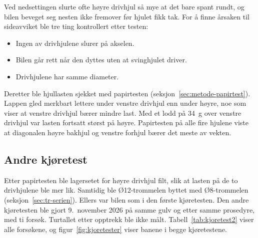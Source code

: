 Ved nedsettingen slurte ofte høyre drivhjul så mye at det bare spant rundt, og bilen beveget seg nesten ikke fremover før hjulet fikk tak. For å finne årsaken til sideavviket ble tre ting kontrollert etter testen:
\begin{itemize}
    \item Ingen av drivhjulene slurer på akselen.
    \item Bilen går rett når den dyttes uten at svinghjulet driver.
    \item Drivhjulene har samme diameter.
\end{itemize}

Deretter ble hjullasten sjekket med papirtesten (seksjon~\ref{sec:metode-papirtest}). Lappen gled merkbart lettere under venstre drivhjul enn under høyre, noe som viser at venstre drivhjul bærer mindre last. Med et lodd på \SI{34}{g} over venstre drivhjul var lasten fortsatt størst på høyre. Papirtesten på alle fire hjulene viste at diagonalen høyre bakhjul og venstre forhjul bærer det meste av vekten.

\subsection{Andre kjøretest}
\label{sec:res-kjoretest2}
Etter papirtesten ble lagersetet for høyre drivhjul filt, slik at lasten på de to drivhjulene ble mer lik. Samtidig ble Ø12-trommelen byttet med Ø8-trommelen (seksjon~\ref{sec:tr-serien}). Ellers var bilen som i den første kjøretesten. Den andre kjøretesten ble gjort 9.~november 2026 på samme gulv og etter samme prosedyre, med ti forsøk. Turtallet etter opptrekk ble ikke målt. Tabell~\ref{tab:kjoretest2} viser alle forsøkene, og figur~\ref{fig:kjoretester} viser banene i begge kjøretestene.

